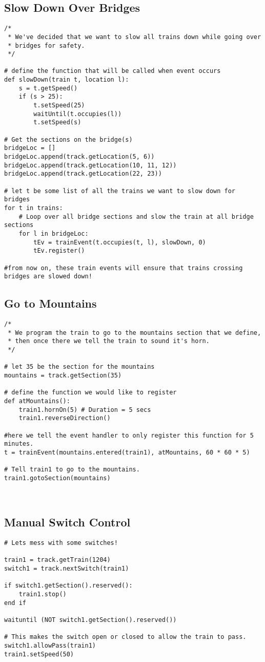 \documentclass[a4paper,11pt,notitlepage]{article}
\begin{document}
\subsection{Slow Down Over Bridges}
\begin{verbatim}
/*
 * We've decided that we want to slow all trains down while going over
 * bridges for safety.
 */

# define the function that will be called when event occurs
def slowDown(train t, location l):
    s = t.getSpeed()
    if (s > 25):
        t.setSpeed(25)
        waitUntil(t.occupies(l))
        t.setSpeed(s)

# Get the sections on the bridge(s)
bridgeLoc = []
bridgeLoc.append(track.getLocation(5, 6))
bridgeLoc.append(track.getLocation(10, 11, 12))
bridgeLoc.append(track.getLocation(22, 23))

# let t be some list of all the trains we want to slow down for bridges
for t in trains:
    # Loop over all bridge sections and slow the train at all bridge sections
    for l in bridgeLoc:
        tEv = trainEvent(t.occupies(t, l), slowDown, 0)
        tEv.register()

#from now on, these train events will ensure that trains crossing bridges are slowed down!

\end{verbatim}
\subsection{Go to Mountains}
\begin{verbatim}
/*
 * We program the train to go to the mountains section that we define,
 * then once there we tell the train to sound it's horn.
 */

# let 35 be the section for the mountains
mountains = track.getSection(35)

# define the function we would like to register
def atMountains():
    train1.hornOn(5) # Duration = 5 secs
    train1.reverseDirection()

#here we tell the event handler to only register this function for 5 minutes.
t = trainEvent(mountains.entered(train1), atMountains, 60 * 60 * 5)

# Tell train1 to go to the mountains.
train1.gotoSection(mountains)



\end{verbatim}
\subsection{Manual Switch Control}
\begin{verbatim}
# Lets mess with some switches!

train1 = track.getTrain(1204)
switch1 = track.nextSwitch(train1)

if switch1.getSection().reserved():
    train1.stop()
end if

waituntil (NOT switch1.getSection().reserved())

# This makes the switch open or closed to allow the train to pass.
switch1.allowPass(train1)
train1.setSpeed(50)
\end{verbatim}
\end{document}
